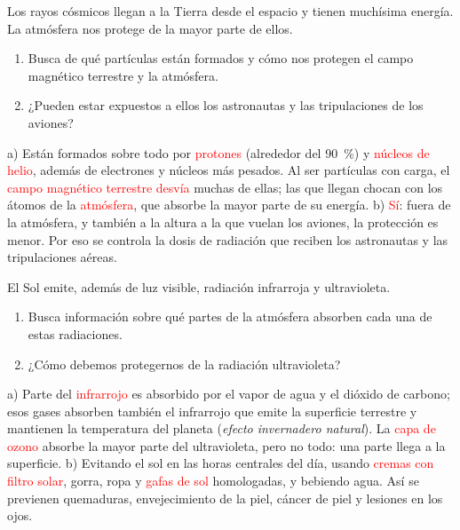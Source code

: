 \begin{exercise}
    Los rayos cósmicos llegan a la Tierra desde el espacio y tienen muchísima energía. La atmósfera nos protege de la mayor parte de ellos.
    \begin{enumerate}[label=\alph*)]
        \item Busca de qué partículas están formados y cómo nos protegen el campo magnético terrestre y la atmósfera.
        \item ¿Pueden estar expuestos a ellos los astronautas y las tripulaciones de los aviones?
    \end{enumerate}
    \begin{solu}
        a) Están formados sobre todo por \textcolor{red}{protones} (alrededor del \qty{90}{\percent}) y \textcolor{red}{núcleos de helio}, además de electrones y núcleos más pesados. Al ser partículas con carga, el \textcolor{red}{campo magnético terrestre desvía} muchas de ellas; las que llegan chocan con los átomos de la \textcolor{red}{atmósfera}, que absorbe la mayor parte de su energía.
        b) \textcolor{red}{Sí}: fuera de la atmósfera, y también a la altura a la que vuelan los aviones, la protección es menor. Por eso se controla la dosis de radiación que reciben los astronautas y las tripulaciones aéreas.
    \end{solu}
\end{exercise}

\begin{exercise}
    El Sol emite, además de luz visible, radiación infrarroja y ultravioleta.
    \begin{enumerate}[label=\alph*)]
        \item Busca información sobre qué partes de la atmósfera absorben cada una de estas radiaciones.
        \item ¿Cómo debemos protegernos de la radiación ultravioleta?
    \end{enumerate}
    \begin{solu}
        a) Parte del \textcolor{red}{infrarrojo} es absorbido por el vapor de agua y el dióxido de carbono; esos gases absorben también el infrarrojo que emite la superficie terrestre y mantienen la temperatura del planeta (\emph{efecto invernadero natural}). La \textcolor{red}{capa de ozono} absorbe la mayor parte del ultravioleta, pero no todo: una parte llega a la superficie.
        b) Evitando el sol en las horas centrales del día, usando \textcolor{red}{cremas con filtro solar}, gorra, ropa y \textcolor{red}{gafas de sol} homologadas, y bebiendo agua. Así se previenen quemaduras, envejecimiento de la piel, cáncer de piel y lesiones en los ojos.
    \end{solu}
\end{exercise}

